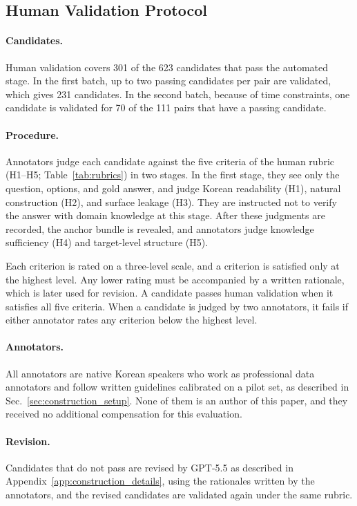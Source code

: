 \subsection{Human Validation Protocol}

\paragraph{Candidates.}
Human validation covers 301 of the 623 candidates that pass the automated stage.
In the first batch, up to two passing candidates per pair are validated, which gives 231 candidates.
In the second batch, because of time constraints, one candidate is validated for 70 of the 111 pairs that have a passing candidate.

\paragraph{Procedure.}
Annotators judge each candidate against the five criteria of the human rubric (H1--H5; Table~\ref{tab:rubrics}) in two stages.
In the first stage, they see only the question, options, and gold answer, and judge Korean readability (H1), natural construction (H2), and surface leakage (H3).
They are instructed not to verify the answer with domain knowledge at this stage.
After these judgments are recorded, the anchor bundle is revealed, and annotators judge knowledge sufficiency (H4) and target-level structure (H5).

Each criterion is rated on a three-level scale, and a criterion is satisfied only at the highest level.
Any lower rating must be accompanied by a written rationale, which is later used for revision.
A candidate passes human validation when it satisfies all five criteria.
When a candidate is judged by two annotators, it fails if either annotator rates any criterion below the highest level.

\paragraph{Annotators.}
All annotators are native Korean speakers who work as professional data annotators and follow written guidelines calibrated on a pilot set, as described in Sec.~\ref{sec:construction_setup}.
None of them is an author of this paper, and they received no additional compensation for this evaluation.

\paragraph{Revision.}
Candidates that do not pass are revised by GPT-5.5 as described in Appendix~\ref{app:construction_details}, using the rationales written by the annotators, and the revised candidates are validated again under the same rubric.

